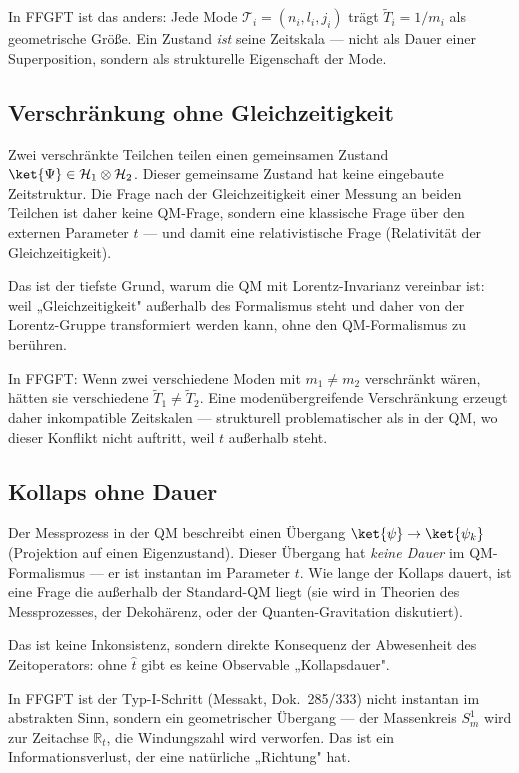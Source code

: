 In FFGFT ist das anders: Jede Mode $\mathcal{T}_i=(n_i,l_i,j_i)$
trägt $\tilde{T}_i = 1/m_i$ als geometrische Größe. Ein
Zustand \emph{ist} seine Zeitskala — nicht als Dauer einer
Superposition, sondern als strukturelle Eigenschaft der Mode.

\subsection{Verschränkung ohne Gleichzeitigkeit}

Zwei verschränkte Teilchen teilen einen gemeinsamen Zustand
$\ket{\Psi} \in \mathcal{H}_1\otimes\mathcal{H}_2$. Dieser
gemeinsame Zustand hat keine eingebaute Zeitstruktur. Die
Frage nach der Gleichzeitigkeit einer Messung an beiden
Teilchen ist daher keine QM-Frage, sondern eine klassische
Frage über den externen Parameter $t$ — und damit eine
relativistische Frage (Relativität der Gleichzeitigkeit).

Das ist der tiefste Grund, warum die QM mit Lorentz-Invarianz
vereinbar ist: weil „Gleichzeitigkeit" außerhalb des
Formalismus steht und daher von der Lorentz-Gruppe
transformiert werden kann, ohne den QM-Formalismus zu berühren.

In FFGFT: Wenn zwei verschiedene Moden mit
$m_1 \neq m_2$ verschränkt wären, hätten sie verschiedene
$\tilde{T}_1 \neq \tilde{T}_2$. Eine modenübergreifende
Verschränkung erzeugt daher inkompatible Zeitskalen —
strukturell problematischer als in der QM, wo dieser Konflikt
nicht auftritt, weil $t$ außerhalb steht.

\subsection{Kollaps ohne Dauer}

Der Messprozess in der QM beschreibt einen Übergang
$\ket{\psi} \to \ket{\psi_k}$ (Projektion auf einen
Eigenzustand). Dieser Übergang hat \emph{keine Dauer} im
QM-Formalismus — er ist instantan im Parameter $t$. Wie lange
der Kollaps dauert, ist eine Frage die außerhalb der
Standard-QM liegt (sie wird in Theorien des Messprozesses,
der Dekohärenz, oder der Quanten-Gravitation diskutiert).

Das ist keine Inkonsistenz, sondern direkte Konsequenz der
Abwesenheit des Zeitoperators: ohne $\hat{t}$ gibt es keine
Observable „Kollapsdauer".

In FFGFT ist der Typ-I-Schritt (Messakt, Dok.~285/333)
nicht instantan im abstrakten Sinn, sondern ein geometrischer
Übergang — der Massenkreis $S^1_m$ wird zur Zeitachse
$\mathbb{R}_t$, die Windungszahl wird verworfen. Das ist
ein Informationsverlust, der eine natürliche „Richtung" hat.

